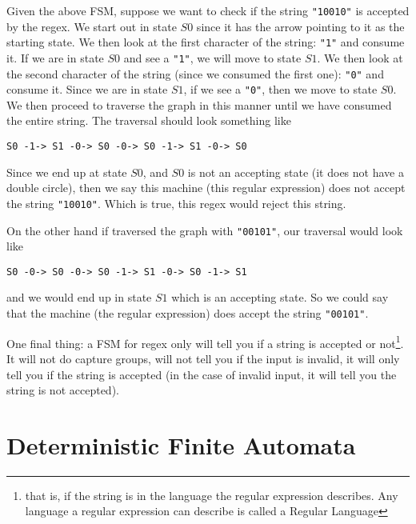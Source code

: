\documentclass[main.tex]{subfiles}
\begin{document}
Given the above FSM, suppose we want to check if the string \texttt{"10010"} is accepted by the regex. We start out in state $S0$ since it has the arrow pointing to it as the starting state. We then look at the first character of the string: \texttt{"1"} and consume it. If we are in state $S0$ and see a \texttt{"1"}, we will move to state $S1$. We then look at the second character of the string (since we consumed the first one): \texttt{"0"} and consume it. Since we are in state $S1$, if we see a \texttt{"0"}, then we move to state $S0$. We then proceed to traverse the graph in this manner until we have consumed the entire string. The traversal should look something like
\begin{center}
\texttt{S0 -1-> S1 -0-> S0 -0-> S0 -1-> S1 -0-> S0}
\end{center}
Since we end up at state $S0$, and $S0$ is not an accepting state (it does not have a double circle), then we say this machine (this regular expression) does not accept the string \texttt{"10010"}. Which is true, this regex would reject this string. 

On the other hand if traversed the graph with \texttt{"00101"}, our traversal would look like 
\begin{center}
    \texttt{S0 -0-> S0 -0-> S0 -1-> S1 -0-> S0 -1-> S1}
\end{center}
and we would end up in state $S1$ which is an accepting state. So we could say that the machine (the regular expression) does accept the string \texttt{"00101"}. 

One final thing: a FSM for regex only will tell you if a string is accepted or not\footnote{that is, if the string is in the language the regular expression describes. Any language a regular expression can describe is called a Regular Language}. It will not do capture groups, will not tell you if the input is invalid, it will only tell you if the string is accepted (in the case of invalid input, it will tell you the string is not accepted). 

\section{Deterministic Finite Automata}
\end{document}
